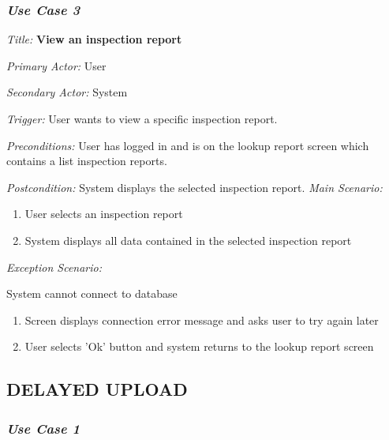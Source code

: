 \documentclass[twoside,letterpaper]{article}
\begin{document}
\subsubsection{\textit{Use Case 3}}

\textit{Title: }{\bfseries\color{black}View an inspection report}

{\color{black} \textit{Primary Actor:} User}

{\color{black} \textit{Secondary Actor:} System}

{\color{black} \textit{Trigger:} User wants to view a specific inspection report.}

{\color{black} \textit{Preconditions:} User has logged in and is on the lookup report screen which contains a list inspection reports.}

{\color{black} \textit{Postcondition:} System displays the selected inspection report.}
\newline
{\color{black} \textit{Main Scenario:}}\
\begin{enumerate}
\item User selects an inspection report
\item System displays all data contained in the selected inspection report
\end{enumerate}
{\color{black} \textit{Exception Scenario:}}

\begin{description}
\item System cannot connect to database
\begin{enumerate}
\item Screen displays connection error message and asks user to try again later
\item User selects 'Ok' button and system returns to the lookup report screen
\end{enumerate}
\end{description}

\subsection[DELAYED UPLOAD]
{\rmfamily\bfseries\color{black}
DELAYED UPLOAD}
\subsubsection{\textit{Use Case 1}}
\end{document}
